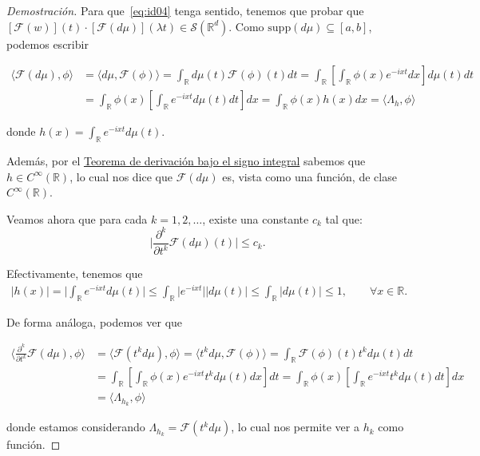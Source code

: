 \begin{proof}[Demostración]
 Para que~\eqref{eq:id04}  tenga sentido, tenemos que probar que \([\mathcal{F}(w)](t)\cdot[\mathcal{F}(d\mu)](\lambda t)\in \mathcal{S}(\mathds{R}^{d})\). Como \(\mathrm{supp}(d\mu)\subseteq[a,b]\), podemos escribir
 
\begin{align*}\langle\mathcal{F}(d\mu),\phi\rangle & = \langle d\mu,\mathcal{F}(\phi)\rangle 
 = \int_{\mathds{R}} d\mu(t)\mathcal{F}(\phi)(t)dt 
 = \int_{\mathds{R}} \left[ \int_{\mathds{R}}\phi(x)e^{-ixt} dx\right]d\mu(t)dt
 \\
 & =  \int_{\mathds{R}} \phi(x) \left[ \int_{\mathds{R}} e^{-ixt} d\mu(t)dt \right] dx 
 =  \int_{\mathds{R}} \phi(x) h(x)dx 
 = \langle \Lambda_{h},\phi\rangle
\end{align*}
 
donde $h(x) = \int_{\mathds{R}} e^{-ixt} d\mu (t)$.
 
 
 Además, por el \hyperref[thm:h02]{Teorema de derivación bajo el signo integral} sabemos que $h\in C^{\infty}(\mathds{R})$, lo cual nos dice que $\mathcal{F}(d\mu)$ es, vista como una función, de clase $C^{\infty}(\mathds{R})$. 
 
Veamos ahora que para cada \(k=1,2,\ldots\), existe una constante \(c_{k}\) tal que:
\[\vert \frac{\partial^{k}}{\partial t^{k}} \mathcal{F}(d\mu)(t)\vert \leq c_{k}.\]


Efectivamente, tenemos que 
\begin{gather} \vert h(x)\vert = \vert \int_{\mathds{R}} e^{-ixt} d\mu (t)\vert \leq  \int_{\mathds{R}} \vert e^{-ixt} \vert \vert d\mu (t)\vert \leq  \int_{\mathds{R}}  \vert d\mu (t)\vert \leq 1, \qquad \forall x\in \mathds{R}.
\end{gather}


De forma análoga, podemos ver que 

\begin{align*}
\langle \frac{\partial^{k}}{\partial t^{k}} \mathcal{F}(d\mu),\phi\rangle &=
\langle \mathcal{F}(t^{k}d\mu),\phi\rangle = \langle t^{k}d\mu, \mathcal{F}(\phi)\rangle  = \int_{\mathds{R}} \mathcal{F} (\phi )(t)t^{k}d\mu (t)dt \\ &= 
\int_{\mathds{R}} \left[ \int_{\mathds{R}}\phi (x)e^{-ixt}t^{k}d\mu (t)dx\right]dt = \int_{\mathds{R}} \phi (x) \left[ \int_{\mathds{R}}e^{-ixt}t^{k}d\mu (t)dt\right]dx 
\\
&=  \langle \Lambda_{h_{k}},\phi \rangle
\end{align*}

donde estamos considerando  $ \Lambda_{h_{k}} = \mathcal{F}(t^{k}d\mu) $, lo cual nos permite ver a  $h_{k}$ como función. 


\end{proof}
